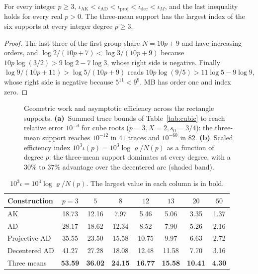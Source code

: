 \begin{proposition}\label{prop:index}
For every integer $p\ge3$,
$\iota_{\mathrm{AK}}<\iota_{\mathrm{AD}}<\iota_{\mathrm{proj}}<\iota_{\mathrm{dec}}<\iota_{M}$, and the
last inequality holds for every real $p>0$. The three-mean support has the largest index of the six
supports at every integer degree $p\ge3$.
\end{proposition}
\begin{proof}
The last three of the first group share $N=10p+9$ and have increasing orders, and
$\log2/(10p+7)<\log3/(10p+9)$ because $10p\log(3/2)>9\log2-7\log3$, whose right side is negative.
Finally $\log9/(10p+11)>\log5/(10p+9)$ reads $10p\log(9/5)>11\log5-9\log9$, whose right side is
negative because $5^{11}<9^{9}$. MB has order one and index zero.
\end{proof}

\begin{figure}[htbp]
\centering\figEfficiency
\caption{Geometric work and asymptotic efficiency across the rectangle supports.
\textbf{(a)}~Summed trace bounds of Table~\ref{tab:cubic} to reach relative error $10^{-d}$ for cube roots
($p=3, X=2, s_0=3/4$): the three-mean support reaches $10^{-12}$ in $41$ traces and $10^{-60}$ in $82$.
\textbf{(b)}~Scaled efficiency index $10^{3}\iota(p)=10^{3}\log\varrho/N(p)$ as a function of degree $p$:
the three-mean support dominates at every degree, with a $30\%$ to $37\%$ advantage over the decentered
arc (shaded band).}\label{fig:efficiency}
\end{figure}

\begin{table}[htbp]
\centering\small
\caption{$10^{3}\iota=10^{3}\log\varrho/N(p)$. The largest value in each column is in bold.}\label{tab:index}
\begin{tabular}{@{}lccccccc@{}}
\toprule
Construction & $p=3$ & $5$ & $8$ & $12$ & $13$ & $20$ & $50$\\
\midrule
AK & 18.73 & 12.16 & 7.97 & 5.46 & 5.06 & 3.35 & 1.37\\
AD & 28.17 & 18.62 & 12.34 & 8.52 & 7.90 & 5.26 & 2.16\\
Projective AD & 35.55 & 23.50 & 15.58 & 10.75 & 9.97 & 6.63 & 2.72\\
Decentered AD & 41.27 & 27.28 & 18.08 & 12.48 & 11.58 & 7.70 & 3.16\\
Three means & \textbf{53.59} & \textbf{36.02} & \textbf{24.15} & \textbf{16.77} & \textbf{15.58} & \textbf{10.41} & \textbf{4.30}\\
\bottomrule
\end{tabular}
\end{table}

